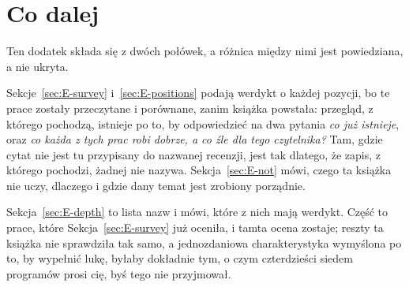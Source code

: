 %
%
%

\chapter{Co dalej}
\label{app:E}

\noindent
Ten dodatek składa się z dwóch połówek, a różnica między nimi jest powiedziana,
a nie ukryta.

Sekcje~\ref{sec:E-survey} i~\ref{sec:E-positions} podają werdykt o każdej
pozycji, bo te prace zostały przeczytane i porównane, zanim książka powstała:
przegląd, z którego pochodzą, istnieje po to, by odpowiedzieć na dwa pytania
\dash{} \emph{co już istnieje}, oraz \emph{co każda z tych prac robi dobrze,
a co źle dla tego czytelnika?} Tam, gdzie cytat nie jest tu przypisany do
nazwanej recenzji, jest tak dlatego, że zapis, z którego pochodzi, żadnej nie
nazywa.
Sekcja~\ref{sec:E-not} mówi, czego ta książka nie uczy, dlaczego i gdzie dany
temat jest zrobiony porządnie.

Sekcja~\ref{sec:E-depth} to lista nazw i mówi, które z nich mają werdykt.
Część to prace, które Sekcja~\ref{sec:E-survey} już oceniła, i tamta ocena
zostaje; reszty ta książka nie sprawdziła tak samo, a jednozdaniowa
charakterystyka wymyślona po to, by wypełnić lukę, byłaby dokładnie tym,
o czym czterdzieści siedem programów prosi cię, byś tego nie przyjmował.

